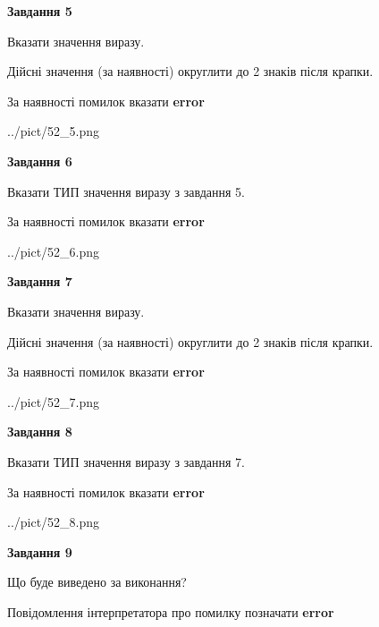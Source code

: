 \documentclass[11pt, ukrainian]{article}
\begin{document}
{\begin {large}
{\begin {center}\textbf{Завдання 5}\end {center}}\par
Вказати значення виразу. \par
Дійсні значення (за наявності) округлити до 2 знаків після крапки. \par
За наявності помилок вказати \textbf{error}

\begin{center}
	{../pict/52_5.png}
\end{center}
\newpage

{\begin {center}\textbf{Завдання 6}\end {center}}\par
Вказати ТИП значення виразу з завдання 5. \par
За наявності помилок вказати \textbf{error}

\begin{center}
	{../pict/52_6.png}
\end{center}
\newpage

{\begin {center}\textbf{Завдання 7}\end {center}}\par
Вказати значення виразу. \par
Дійсні значення (за наявності) округлити до 2 знаків після крапки. \par
За наявності помилок вказати \textbf{error}

\begin{center}
	{../pict/52_7.png}
\end{center}
\newpage

{\begin {center}\textbf{Завдання 8}\end {center}}\par
Вказати ТИП значення виразу з завдання 7. \par
За наявності помилок вказати \textbf{error}

\begin{center}
	{../pict/52_8.png}
\end{center}
\newpage

{\begin {center}\textbf{Завдання 9}\end {center}}\par
Що буде виведено за виконання? \par
Повідомлення інтерпретатора про помилку позначати \textbf{error}


\end{large}}
\end{document}
